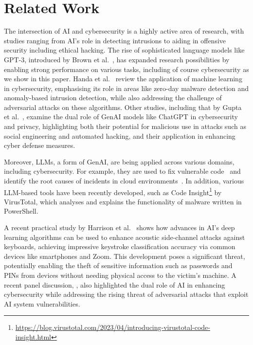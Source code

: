 \section{Related Work}
\label{Related work}

The intersection of AI and cybersecurity is a highly active area of research, with studies ranging
from AI's role in detecting intrusions to aiding in offensive security including ethical hacking. The rise of sophisticated language models like GPT-3, introduced by Brown et al.\ \cite{brown2020language}, has expanded research possibilities by enabling strong performance on various tasks, including of course cybersecurity as we show in this paper.  %
Handa et al.\ \cite{Handa2018machine} review the application of machine learning in cybersecurity, emphasising its role in areas like zero-day malware detection and anomaly-based intrusion detection, while also addressing the challenge of adversarial attacks on these algorithms.  
Other  studies, including that by Gupta et al.\ \cite{gupta2023chatgpt}, examine the dual role of GenAI models like ChatGPT in cybersecurity and privacy, highlighting both their potential for malicious use in attacks such as social engineering and automated hacking, and their application in enhancing cyber defense  measures.

Moreover,  LLMs, a form of GenAI, are being applied across various domains, including cybersecurity. For example, they are used to fix vulnerable code~\cite{pearce2023examining} and identify the root causes of incidents in cloud environments~\cite{ahmed2023recommending}.  In addition, various LLM-based tools have been recently developed, such as Code Insight\footnote{\url{https://blog.virustotal.com/2023/04/introducing-virustotal-code-insight.html}} by VirusTotal, which analyses and explains the functionality of malware written in PowerShell. %

 

 A recent practical study by Harrison et
al.\ \cite{DBLP:conf/eurosp/HarrisonTM23} shows how advances in AI's deep learning algorithms can
be used to enhance acoustic side-channel attacks against keyboards, achieving impressive keystroke
classification accuracy via common devices like smartphones and Zoom. This development poses a
significant threat, potentially enabling the theft of sensitive information such as passwords and
PINs from devices without needing physical access to the victim's machine. A recent panel
discussion, \cite{bertino2021ai}, also highlighted the dual role of AI in enhancing cybersecurity
while addressing the rising threat of adversarial attacks that exploit AI system vulnerabilities.


